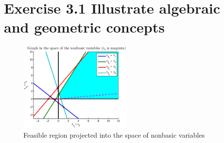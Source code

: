 \section{Exercise 3.1 Illustrate algebraic and geometric concepts}



\begin{figure}[h!!]
\includegraphics[width=0.5\textwidth]{p1/p1.eps}
\caption{Feasible region projected into the space of nonbasic variables}\label{fig:p1}
\end{figure}
